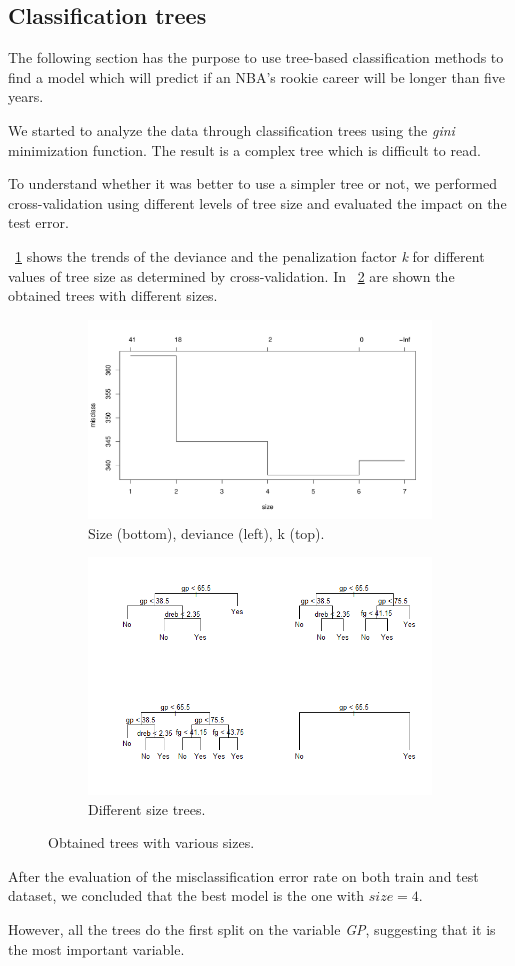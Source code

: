 \subsection{Classification trees}

The following section has the purpose to use tree-based classification methods to find a model which will predict if an NBA's rookie career will be longer than five years.

We started to analyze the data through classification trees using the \textit{gini} minimization function. The result is a complex tree which is difficult to read.

To understand whether it was better to use a simpler tree or not, we performed cross-validation using different levels of tree size and evaluated the impact on the test error.

\Fig~\ref{fig:tree_cv_plot} shows the trends of the deviance and the penalization factor \textit{k} for different values of tree size as determined by cross-validation. In \Fig~\ref{fig:tree_prune_comparison} are shown the obtained trees with different sizes.

\begin{figure}[h]
	\centering
	\begin{subfigure}{.6\textwidth}
		\centering
		\includegraphics[width=0.5\linewidth]{ImageFiles/Classification/Trees/tree_cv_plot}
		\caption{Size (bottom), deviance (left), k (top).}
		\label{fig:tree_cv_plot}
	\end{subfigure}%
	\begin{subfigure}{.6\textwidth}
		\centering
		\includegraphics[width=0.6\linewidth]{ImageFiles/Classification/Trees/tree_prune_comparison}
		\caption{Different size trees.}
		\label{fig:tree_prune_comparison}
	\end{subfigure}
	\caption{Obtained trees with various sizes.}
	\label{fig:treeSize}
\end{figure}

After the evaluation of the misclassification error rate on both train and test dataset, we concluded that the best model is the one with $size = 4$.

However, all the trees do the first split on the variable \textit{GP}, suggesting that it is the most important variable.
